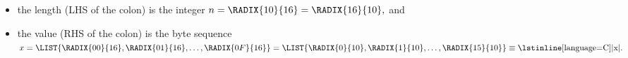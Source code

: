 \begin{itemize}
\item the length (LHS of the colon) is the integer
      $
      n = \RADIX{10}{16} = \RADIX{16}{10} ,
      $
      and
\item the value  (RHS of the colon) is the byte sequence
      $
      x = \LIST{ \RADIX{00}{16}, \RADIX{01}{16}, \ldots, \RADIX{0F}{16} } = \LIST{ \RADIX{0}{10}, \RADIX{1}{10}, \ldots, \RADIX{15}{10} } \equiv \mbox{\lstinline[language={C}]|x|} .
      $
\end{itemize}
